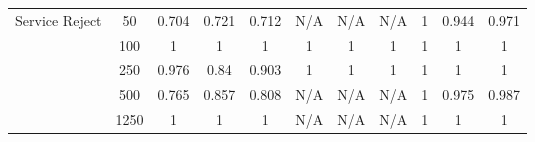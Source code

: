 \begin{table*}[]
{\begin{tabular}{ccccccccccc}
			\multicolumn{1}{|c|}{\multirow{6}{*}{Service Reject}}             & \multicolumn{1}{c|}{50}            & \multicolumn{1}{c|}{0.704}                   & \multicolumn{1}{c|}{0.721}                & \multicolumn{1}{c|}{0.712}            & \multicolumn{1}{c|}{N/A}                      & \multicolumn{1}{c|}{N/A}                   & \multicolumn{1}{c|}{N/A}               & \multicolumn{1}{c|}{1}                      & \multicolumn{1}{c|}{0.944}               & \multicolumn{1}{c|}{0.971}           \\ \cline{2-11}
			\multicolumn{1}{|c|}{}                                            & \multicolumn{1}{c|}{100}           & \multicolumn{1}{c|}{1}                       & \multicolumn{1}{c|}{1}                    & \multicolumn{1}{c|}{1}                & \multicolumn{1}{c|}{1}                        & \multicolumn{1}{c|}{1}                     & \multicolumn{1}{c|}{1}                 & \multicolumn{1}{c|}{1}                      & \multicolumn{1}{c|}{1}                   & \multicolumn{1}{c|}{1}               \\ \cline{2-11}
			\multicolumn{1}{|c|}{}                                            & \multicolumn{1}{c|}{250}           & \multicolumn{1}{c|}{0.976}                   & \multicolumn{1}{c|}{0.84}                 & \multicolumn{1}{c|}{0.903}            & \multicolumn{1}{c|}{1}                        & \multicolumn{1}{c|}{1}                     & \multicolumn{1}{c|}{1}                 & \multicolumn{1}{c|}{1}                      & \multicolumn{1}{c|}{1}                   & \multicolumn{1}{c|}{1}               \\ \cline{2-11}
			\multicolumn{1}{|c|}{}                                            & \multicolumn{1}{c|}{500}           & \multicolumn{1}{c|}{0.765}                   & \multicolumn{1}{c|}{0.857}                & \multicolumn{1}{c|}{0.808}            & \multicolumn{1}{c|}{N/A}                      & \multicolumn{1}{c|}{N/A}                   & \multicolumn{1}{c|}{N/A}               & \multicolumn{1}{c|}{1}                      & \multicolumn{1}{c|}{0.975}               & \multicolumn{1}{c|}{0.987}           \\ \cline{2-11}
			\multicolumn{1}{|c|}{}                                            & \multicolumn{1}{c|}{1250}          & \multicolumn{1}{c|}{1}                       & \multicolumn{1}{c|}{1}                    & \multicolumn{1}{c|}{1}                & \multicolumn{1}{c|}{N/A}                        & \multicolumn{1}{c|}{N/A}                     & \multicolumn{1}{c|}{N/A}                 & \multicolumn{1}{c|}{1}                      & \multicolumn{1}{c|}{1}                   & \multicolumn{1}{c|}{1}               \\ \cline{2-11}

\end{tabular}}
\end{table*}

